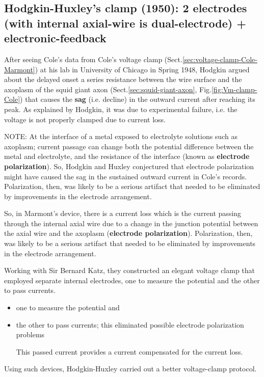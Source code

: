 \subsection{Hodgkin-Huxley's clamp (1950): 2 electrodes (with internal 
axial-wire is dual-electrode) + electronic-feedback}
\label{sec:voltage-clamp-hodgkin-huxley}
\label{sec:voltage-clamp-two-electrodes}
\label{sec:double-micr-techn}

After seeing Cole's data from Cole's voltage clamp
(Sect.\ref{sec:voltage-clamp-Cole-Marmont}) at his lab in University of Chicago
in Spring 1948, Hodgkin argued about the delayed onset a series resistance
between the wire surface and the axoplasm of the squid giant axon
(Sect.\ref{sec:squid-giant-axon}, Fig.\ref{fig:Vm-clamp-Cole}) that causes the
{\bf sag} (i.e. decline) in the outward current after reaching its peak. As
explained by Hodgkin, it was due to experimental failure, i.e. the voltage is
not properly clamped due to current loss.

NOTE: At the interface of a metal exposed to electrolyte solutions such as
axoplasm; current passage can change both the potential difference between the
metal and electrolyte, and the resistance of the interface (known as {\bf
electrode polarization}). So, Hodgkin and Huxley conjectured that electrode
polarization might have caused the sag in the sustained outward current in
Cole's records. Polarization, then, was likely to be a serious artifact that
needed to be eliminated by improvements in the electrode arrangement.

So, in Marmont's device, there is a current loss which is the current passing
through the internal axial wire due to a change in the junction potential
between the axial wire and the axoplasm ({\bf electrode polarization}). 
Polarization, then, was likely to be a serious artifact that needed to be
eliminated by improvements in the electrode arrangement.

Working with Sir Bernard Katz, they constructed an elegant
voltage clamp that employed separate internal electrodes, one to measure the
potential and the other to pass currents.
\begin{itemize}
  \item   one to measure the potential and 
  
  \item the other to pass currents; this eliminated possible electrode
  polarization problems

This passed current provides a current compensated for the current loss.

\end{itemize}
Using such devices, Hodgkin-Huxley carried out a better voltage-clamp protocol.

